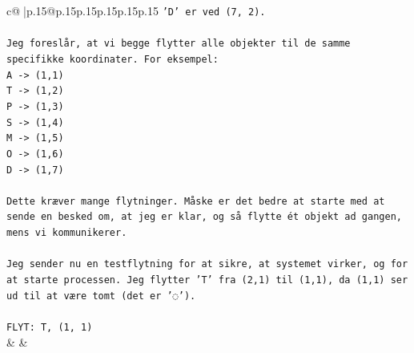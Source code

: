 \documentclass{article}
\begin{document}
{\begin{supertabular}{c@{$\;$}|p{.15\linewidth}@{}p{.15\linewidth}p{.15\linewidth}p{.15\linewidth}p{.15\linewidth}p{.15\linewidth}}
{{{\texttt{'D' er ved (7, 2).} \\
\\ 
\texttt{Jeg foreslår, at vi begge flytter alle objekter til de samme specifikke koordinater. For eksempel:} \\
\texttt{A {-}> (1,1)} \\
\texttt{T {-}> (1,2)} \\
\texttt{P {-}> (1,3)} \\
\texttt{S {-}> (1,4)} \\
\texttt{M {-}> (1,5)} \\
\texttt{O {-}> (1,6)} \\
\texttt{D {-}> (1,7)} \\
\\ 
\texttt{Dette kræver mange flytninger. Måske er det bedre at starte med at sende en besked om, at jeg er klar, og så flytte ét objekt ad gangen, mens vi kommunikerer.} \\
\\ 
\texttt{Jeg sender nu en testflytning for at sikre, at systemet virker, og for at starte processen. Jeg flytter 'T' fra (2,1) til (1,1), da (1,1) ser ud til at være tomt (det er '◌').} \\
\\ 
\texttt{FLYT: T, (1, 1)} \\
            }
        }
    }
    & & \\ \\


\end{supertabular}}
\end{document}
